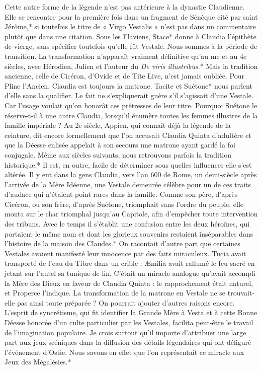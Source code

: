 \documentclass[a4paper, 11pt, oneside, polutonikogreek, french]{article}
\begin{document}
Cette autre forme de la légende n'est pas antérieure à la dynastie Claudienne. Elle se rencontre pour la première fois dans un fragment de Sénèque cité par saint Jérôme,* si toutefois le titre de « Virgo Vestalis » n'est pas dans un commentaire plutôt que dans une citation. Sous les Flaviens, Stace* donne à Claudia l'épithète de vierge, sans spécifier toutefois qu'elle fût Vestale. Nous sommes à la période de transition. La transformation n'apparaît vraiment définitive qu'au me et au 4e siècles, avec Hérodien, Julien et l'auteur du \emph{De viris illustribus}.* Mais la tradition ancienne, celle de Cicéron, d'Ovide et de Tite Live, n'est jamais oubliée. Pour Pline l'Ancien, Claudia est toujours la matrone. Tacite et Suétone* nous parlent d'elle sans la qualifier. Le fait ne s'expliquerait guère s'il s'agissait d'une Vestale. Car l'usage voulait qu'on honorât ces prêtresses de leur titre. Pourquoi Suétone le réserve-t-il à une autre Claudia, lorsqu'il énumère toutes les femmes illustres de la famille impériale ? Au 2e siècle, Appien, qui connaît déjà la légende de la ceinture, dit encore formellement que l'on accusait Claudia Quinta d'adultère et que la Déesse enlisée appelait à son secours une matrone ayant gardé la foi conjugale. Même aux siècles suivants, nous retrouvons parfois la tradition historique.* Il est, en outre, facile de déterminer sous quelles influences elle s'est altérée. Il y eut dans la gens Claudia, vers l'an 600 de Rome, un demi-siècle après l'arrivée de la Mère Idéenne, une Vestale demeurée célèbre pour un de ces traits d'audace qui n'étaient point rares dans la famille. Comme son père, d'après Cicéron, ou son frère, d'après Suétone, triomphait sans l'ordre du peuple, elle monta sur le char triomphal jusqu'au Capitole, afin d'empêcher toute intervention des tribuns. Avec le temps il s'établit une confusion entre les deux héroïnes, qui portaient le même nom et dont les glorieux souvenirs restaient inséparables dans l'histoire de la maison des Claudes.* On racontait d'autre part que certaines Vestales avaient manifesté leur innocence par des faits miraculeux. Tucia avait transporté de l'eau du Tibre dans un crible : Æmilia avait rallumé le feu sacré en jetant sur l'autel sa tunique de lin. C'était un miracle analogue qu'avait accompli la Mère des Dieux en faveur de Claudia Quinta : le rapprochement était naturel, et Properce l'indique. La transformation de la matrone en Vestale ne se trouvait-elle pas ainsi toute préparée ? On pourrait ajouter d'autres raisons encore. L'esprit de syncrétisme, qui fit identifier la Grande Mère à Vesta et à cette Bonne Déesse honorée d'un culte particulier par les Vestales, facilita peut-être le travail de l'imagination populaire. Je crois surtout qu'il importe d'attribuer une large part aux jeux scéniques dans la diffusion des détails légendaires qui ont défiguré l'événement d'Ostie. Nous savons en effet que l'on représentait ce miracle aux Jeux des Mégalésies.*
\end{document}
